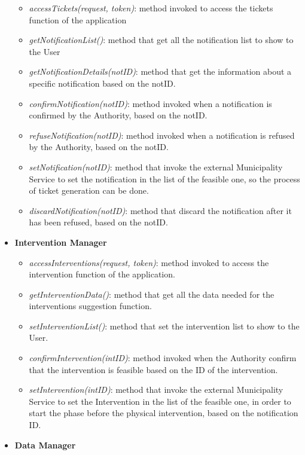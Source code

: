 \documentclass{article}
\begin{document}
\begin{itemize}
    		\begin{itemize}
        		\item {\it accessTickets(request, token)}: method invoked to access the tickets function of the application
        		\item {\it getNotificationList()}: method that get all the notification list to show to the User
        		\item {\it getNotificationDetails(notID)}: method that get the information about a specific notification based on the notID.
        		\item {\it confirmNotification(notID)}: method invoked when a notification is confirmed by the Authority, based on the notID.
        		\item {\it refuseNotification(notID)}: method invoked when a notification is refused by the Authority, based on the notID.
        		\item {\it setNotification(notID)}: method that invoke the external Municipality Service to set the notification in the list of the feasible one, so the process of ticket generation can be done.
        		\item {\it discardNotification(notID)}: method that discard the notification after it has been refused, based on the notID.
    		\end{itemize}
    	\item {\bf Intervention Manager}
    		\begin{itemize}
        		\item {\it accessInterventions(request, token)}: method invoked to access the intervention function of the application.
        		\item {\it getInterventionData()}: method that get all the data needed for the interventions suggestion function.
        		\item {\it setInterventionList()}: method that set the intervention list to show to the User. 
        		\item {\it confirmIntervention(intID)}: method invoked when the Authority confirm that the intervention is feasible based on the ID of the intervention.
        		\item {\it setIntervention(intID)}: method that invoke the external Municipality Service to set the Intervention in the list of the feasible one, in order to start the phase before the physical intervention, based on the notification ID.  
    		\end{itemize}
    	\item {\bf Data Manager}

\end{itemize}
\end{document}
